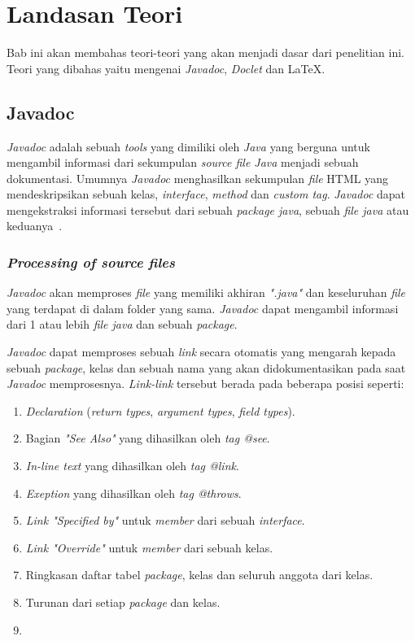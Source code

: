\lstset{style=mystyle}
\chapter{Landasan Teori}
\label{chap:teori}
Bab ini akan membahas teori-teori yang akan menjadi dasar dari penelitian ini. Teori yang dibahas yaitu mengenai {\it Javadoc}, {\it Doclet} dan \LaTeX .

\section{Javadoc}
\label{sec:javadoc} 
{\it Javadoc} adalah sebuah {\it tools} yang dimiliki oleh {\it Java} yang berguna untuk mengambil informasi dari sekumpulan {\it source file Java} menjadi sebuah dokumentasi. Umumnya {\it Javadoc} menghasilkan sekumpulan {\it file} HTML yang mendeskripsikan sebuah kelas, {\it interface}, {\it method} dan {\it custom tag}. {\it Javadoc} dapat mengekstraksi informasi tersebut dari sebuah {\it package java}, sebuah {\it file java} atau keduanya~\cite{javadoc:01:javadoc}.

\subsection{\textit{Processing of source files}}
\label{sec:javadoc}
{\it Javadoc} akan memproses {\it file} yang memiliki akhiran {\it ".java"} dan keseluruhan {\it file} yang terdapat di dalam folder yang sama. {\it Javadoc} dapat mengambil informasi dari 1 atau lebih {\it file java} dan sebuah {\it package}.

{\it Javadoc} dapat memproses sebuah {\it link} secara otomatis yang mengarah kepada sebuah {\it package}, kelas dan sebuah nama yang akan didokumentasikan pada saat {\it Javadoc} memprosesnya. {\it Link-link} tersebut berada pada beberapa posisi seperti:
\begin{enumerate}
	\item {\it Declaration} ({\it return types}, {\it argument types}, {\it field types}).
	\item Bagian {\it "See Also"} yang dihasilkan oleh {\it tag @see}.
	\item {\it In-line text} yang dihasilkan oleh {\it tag {@link}}.
	\item {\it Exeption} yang dihasilkan oleh {\it tag @throws}.
	\item {\it Link "Specified by"} untuk {\it member} dari sebuah {\it interface}.
	\item {\it Link "Override"} untuk {\it member} dari sebuah kelas.
	\item Ringkasan daftar tabel {\it package}, kelas dan seluruh anggota dari kelas.
	\item Turunan dari setiap {\it package} dan kelas.
	\item 
\end{enumerate}

